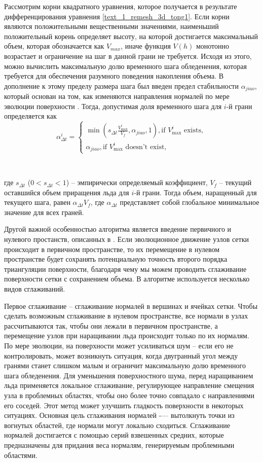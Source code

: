 Рассмотрим корни квадратного уравнения, которое получается в результате дифференцирования уравнения \eqref{text_1_remesh_3d_tong1}.
Если корни являются положительными вещественными значениями, наименьший положительный корень определяет высоту, на которой достигается максимальный объем, которая обозначается как $V_{max}$, иначе функция $V(h)$ монотонно возрастает и ограничение на шаг в данной грани не требуется.
Исходя из этого, можно вычислить максимальную долю временного шага обледенения, которая требуется для обеспечения разумного поведения накопления объема.
В дополнение к этому пределу размера шага был введен предел стабильности $\alpha_{jiao}$, который основан на том, как изменяются направления нормалей по мере эволюции поверхности \cite{Jiao2007Offsetting}.
Тогда, допустимая доля временного шага для $i$-й грани определяется как
\begin{equation}
\alpha_{\Delta t}^i=
\begin{cases}
\min(s_{\Delta t}\frac{V_{\max}^i}{V_f},\alpha_{jiao},1), \text{if $V_{\max}^i$ exists}, \\
\alpha_{jiao}, \text{if $V_{\max}^i$ doesn't exist},
\end{cases}
\end{equation}

\

где $s_{\Delta t}$ ($0 < s_{\Delta t} < 1$) -- эмпирически определяемый коэффициент, $V_f$ -- текущий оставшийся объем приращения льда для $i$-й грани.
Тогда объем, наращенный для текущего шага, равен $\alpha_{\Delta t} V_f$, где $\alpha_{\Delta t}$ представляет собой глобальное минимальное значение для всех граней.

Другой важной особенностью алгоритма является введение первичного и нулевого простанств, описанных в \cite{Jiao2006Smooth}.
Если эволюционное движение узлов сетки происходит в первичном пространстве, то их перемещение в нулевом пространстве будет сохранять потенциальную точность второго порядка триангуляции поверхности, благодаря чему мы можем  проводить сглаживание поверхности сетки с сохранением объема.
В алгоритме используется несколько видов сглаживаний.

Первое сглаживание -- сглаживание нормалей в вершинах и ячейках сетки.
Чтобы сделать возможным сглаживание в нулевом пространстве, все нормали в узлах рассчитываются так, чтобы они лежали в первичном пространстве, а перемещение узлов при наращивании льда происходит только по их нормалям.
По мере эволюции, на поверхности может усиливаться шум -- если его не контролировать, может возникнуть ситуация, когда двугранный угол между гранями станет слишком малым и ограничит максимальную долю временного шага обледенения.
Для уменьшения поверхностного шума, перед наращиванием льда применяется локальное сглаживание, регулирующее направление смещения узла в проблемных областях, чтобы оно более точно совпадало с направлениями его соседей.
Этот метод может улучшить гладкость поверхности в некоторых ситуациях.
Основная цель сглаживания нормалей -— вытолкнуть точки из вогнутых областей, где нормали могут локально сходиться.
Сглаживание нормалей достигается с помощью серий взвешенных средних, которые предназначены для придания веса нормалям, генерируемым проблемными областями.

